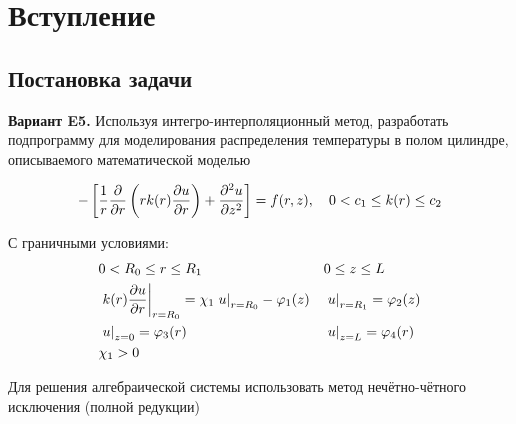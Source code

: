 \documentclass[a4paper,12pt]{article}
\begin{document}
\newcommand\mLim[4]{
  \int\limits^{r_{i #1}}_{r_{i #2}}
  \int\limits^{z_{j #3}}_{z_{j #4}}
}

\newcommand\Int[2]{
  \int\limits^{#1}_{#2}
}

\newcommand\mLimS[3]
{
  \int\limits^{#1_{i#2}}_{#1_{i#3}}
}

\newcommand\mLimZ[4]
{
  \int\limits^{#1_{#4 #2}}_{#1_{#4 #3}}
}


  \tableofcontents
  \newpage
  \section{Вступление}
  \subsection{Постановка задачи}

  \textbf{Вариант E5.} Используя интегро-интерполяционный метод, разработать подпрограмму для моделирования распределения температуры в полом цилиндре, описываемого математической моделью

  \begin{equation}\label{eq1}
    - \left [ \frac{1}{r} \pdv{}{r} \left ( r k(r) \pdv{u}{r} \right ) 
    + \pdv[2]{u}{z} \right ] = f(r, z), \quad 0 < c_1 \le k(r) \le c_2
  \end{equation}

  С граничными условиями:
  \begin{align*}
    & 0 < R_0 \le r \leq R_1 &
    & 0 \leq z \leq L \\
    & \left . k(r) \pdv{u}{r} \right \vert_{r=R_0} = \chi_1 \left . u \right \vert_{r=R_0} - \varphi_1(z) &
    & \left . u \right \vert_{r=R_1} = \varphi_2(z) \\
    & \left . u \right \vert_{z=0} = \varphi_3(r) &
    & \left . u \right \vert_{z=L} = \varphi_4(r) \\
    & \chi_1 > 0 &
  \end{align*}
  
  Для решения алгебраической системы использовать метод нечётно-чётного исключения (полной редукции)

  \newpage
  

  \newpage
  

  \newpage
  

  \newpage
  

  \newpage
  




\end{document}
